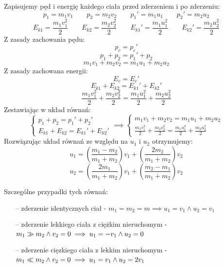 \documentclass[a4paper]{article}
\begin{document}
    Zapisujemy pęd i energię każdego ciała przed zderzeniem i po zderzeniu:
    \[p_1 = m_1v_1 \qquad p_2 = m_2v_2 \qquad p_1' = m_1u_1 \qquad p_2' = m_2u_2 \]
    \[E_{k1} = \frac{m_1v_1^2}{2} \qquad E_{k2} = \frac{m_2v_2^2}{2} \qquad
    E_{k1}' = \frac{m_1u_1^2}{2} \qquad E_{k2}' = \frac{m_2u_2^2}{2}\]
    Z zasady zachowania pędu: 
    \[p_c = p_c'\]
    \[p_1 + p_2 = p_1' + p_2\]
    \[m_1v_1 + m_2v_2 = m_1u_1 + m_2u_2\]
    Z zasady zachowana energii:
    \[E_c = E_c'\]
    \[E_{k1} + E_{k2} = E_{k1}' + E_{k2}'\]
    \[\frac{m_1v_1^2}{2} + \frac{m_2v_2^2}{2} = \frac{m_1u_1^2}{2} + \frac{m_2u_2^2}{2}\]
    Zestawiając w układ równań:
    \[
        \begin{cases}
            p_1 + p_2 = p_1' + p_2' \\
            E_{k1} + E_{k2} = E_{k1}' + E_{k2}'
        \end{cases}
        \implies
        \begin{cases}
            m_1v_1 + m_2v_2 = m_1u_1 + m_2u_2 \\
            \frac{m_1v_1^2}{2} + \frac{m_2v_2^2}{2} = \frac{m_1u_1^2}{2} + \frac{m_2u_2^2}{2}
        \end{cases}
    \]
    Rozwiązując układ równań ze względu na $u_1$ i $u_2$ otrzymujemy:
    \[u_1 = \left(\frac{m_1 - m_2}{m_1 + m_2}\right)v_1 + \left(\frac{2m_2}{m_1 + m_2}\right)v_2\]
    \[u_2 = \left(\frac{2m_1}{m_1 + m_2}\right)v_1 + \left(\frac{m_2 - m_1}{m_1 + m_2}\right)v_2\]

    Szczególne przypadki tych równań:
    \begin{itemize}
        \item[--] zderzenie identycznych ciał - $m_1 = m_2 = m \implies u_1 = v_1 \land u_2 = v_1$
        \item[--] zderzenie lekkiego ciała z ciężkim nieruchomym - $m_1 \gg m_2 \land v_2 = 0 
        \\ \implies u_1 = -v_1 \land u_2 = 0$
        \item[--] zderzenie cięzkiego ciała z lekkim nieruchomym - $m_1 \ll m_2 \land v_2 = 0 
        \\ \implies u_1 = v_1 \land u_2 = 2v_1$
    \end{itemize}

    \pagebreak
\end{document}
